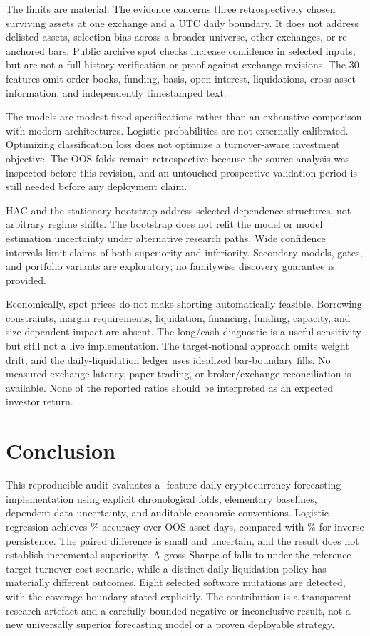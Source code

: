 \documentclass[preprint,12pt,authoryear]{elsarticle}
\begin{document}
The limits are material. The evidence concerns three retrospectively chosen surviving assets at one exchange and a UTC daily boundary. It does not address delisted assets, selection bias across a broader universe, other exchanges, or re-anchored bars. Public archive spot checks increase confidence in selected inputs, but are not a full-history verification or proof against exchange revisions. The 30 features omit order books, funding, basis, open interest, liquidations, cross-asset information, and independently timestamped text.

The models are modest fixed specifications rather than an exhaustive comparison with modern architectures. Logistic probabilities are not externally calibrated. Optimizing classification loss does not optimize a turnover-aware investment objective. The OOS folds remain retrospective because the source analysis was inspected before this revision, and an untouched prospective validation period is still needed before any deployment claim.

HAC and the stationary bootstrap address selected dependence structures, not arbitrary regime shifts. The bootstrap does not refit the model or model estimation uncertainty under alternative research paths. Wide confidence intervals limit claims of both superiority and inferiority. Secondary models, gates, and portfolio variants are exploratory; no familywise discovery guarantee is provided.

Economically, spot prices do not make shorting automatically feasible. Borrowing constraints, margin requirements, liquidation, financing, funding, capacity, and size-dependent impact are absent. The long/cash diagnostic is a useful sensitivity but still not a live implementation. The target-notional approach omits weight drift, and the daily-liquidation ledger uses idealized bar-boundary fills. No measured exchange latency, paper trading, or broker/exchange reconciliation is available. None of the reported ratios should be interpreted as an expected investor return.

\section{Conclusion}
This reproducible audit evaluates a \FeatureCount{}-feature daily cryptocurrency forecasting implementation using explicit chronological folds, elementary baselines, dependent-data uncertainty, and auditable economic conventions. Logistic regression achieves \LogisticAccuracy\% accuracy over \PredictionCount{} OOS asset-days, compared with \InverseAccuracy\% for inverse persistence. The paired difference is small and uncertain, and the result does not establish incremental superiority. A gross Sharpe of \GrossSharpe{} falls to \NetSharpe{} under the reference target-turnover cost scenario, while a distinct daily-liquidation policy has materially different outcomes. Eight selected software mutations are detected, with the coverage boundary stated explicitly. The contribution is a transparent research artefact and a carefully bounded negative or inconclusive result, not a new universally superior forecasting model or a proven deployable strategy.
\end{document}

